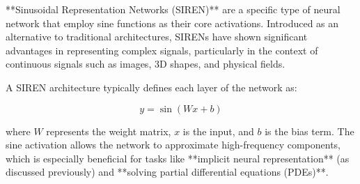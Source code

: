 **Sinusoidal Representation Networks (SIREN)** are a specific type of neural network that employ sine functions as their core activations. Introduced as an alternative to traditional architectures, SIRENs have shown significant advantages in representing complex signals, particularly in the context of continuous signals such as images, 3D shapes, and physical fields.

A SIREN architecture typically defines each layer of the network as:

\[
y = \sin(Wx + b)
\]

where \(W\) represents the weight matrix, \(x\) is the input, and \(b\) is the bias term. The sine activation allows the network to approximate high-frequency components, which is especially beneficial for tasks like **implicit neural representation** (as discussed previously) and **solving partial differential equations (PDEs)**.








